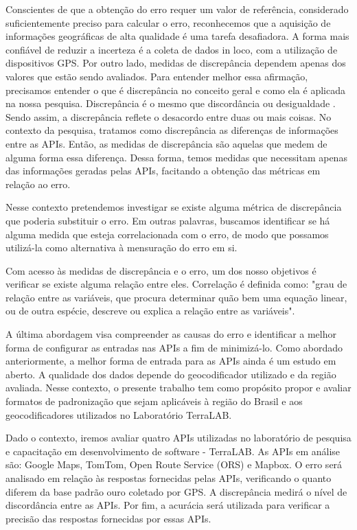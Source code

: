 Conscientes de que a obtenção do erro requer um valor de referência, considerado suficientemente preciso para calcular o erro, reconhecemos que a aquisição de informações geográficas de alta qualidade é uma tarefa desafiadora. A forma mais confiável de reduzir a incerteza é a coleta de dados in loco, com a utilização de dispositivos GPS.
Por outro lado, medidas de discrepância dependem apenas dos valores que estão sendo avaliados. Para entender melhor essa afirmação, precisamos entender o que é discrepância no conceito geral e como ela é aplicada na nossa pesquisa. Discrepância é o mesmo que discordância ou desigualdade \cite{klein2015}. Sendo assim, a discrepância reflete o desacordo entre duas ou mais coisas. No contexto da pesquisa, tratamos como discrepância as diferenças de informações entre as APIs. Então, as medidas de discrepância são aquelas que medem de alguma forma essa diferença. Dessa forma, temos medidas que necessitam apenas das informações geradas pelas APIs, facitando a obtenção das métricas em relação ao erro.

Nesse contexto pretendemos investigar se existe alguma métrica de discrepância que poderia substituir o erro. Em outras palavras, buscamos identificar se há alguma medida que esteja correlacionada com o erro, de modo que possamos utilizá-la como alternativa à mensuração do erro em si.

Com acesso às medidas de discrepância e o erro, um dos nosso objetivos é verificar se existe alguma relação entre eles. Correlação é definida como: "grau de relação entre as variáveis, que procura determinar quão bem uma equação linear, ou de outra espécie, descreve ou explica a relação entre as variáveis"\cite{spiegel2009}.

A última abordagem visa compreender as causas do erro e identificar a melhor forma de configurar as entradas nas APIs a fim de minimizá-lo. Como abordado anteriormente, a melhor forma de entrada para as APIs ainda é um estudo em aberto. A qualidade dos dados depende do geocodificador utilizado e da região avaliada. Nesse contexto, o presente trabalho tem como propósito propor e avaliar formatos de padronização que sejam aplicáveis à região do Brasil e aos geocodificadores utilizados no Laboratório TerraLAB.

Dado o contexto, iremos avaliar quatro APIs utilizadas no laboratório de pesquisa e capacitação em desenvolvimento de software - TerraLAB. As APIs em análise são: Google Maps, TomTom, Open Route Service (ORS) e Mapbox. O erro será analisado em relação às respostas fornecidas pelas APIs, verificando o quanto diferem da base padrão ouro coletado por GPS. A discrepância medirá o nível de discordância entre as APIs. Por fim, a acurácia será utilizada para verificar a precisão das respostas fornecidas por essas APIs.
    
